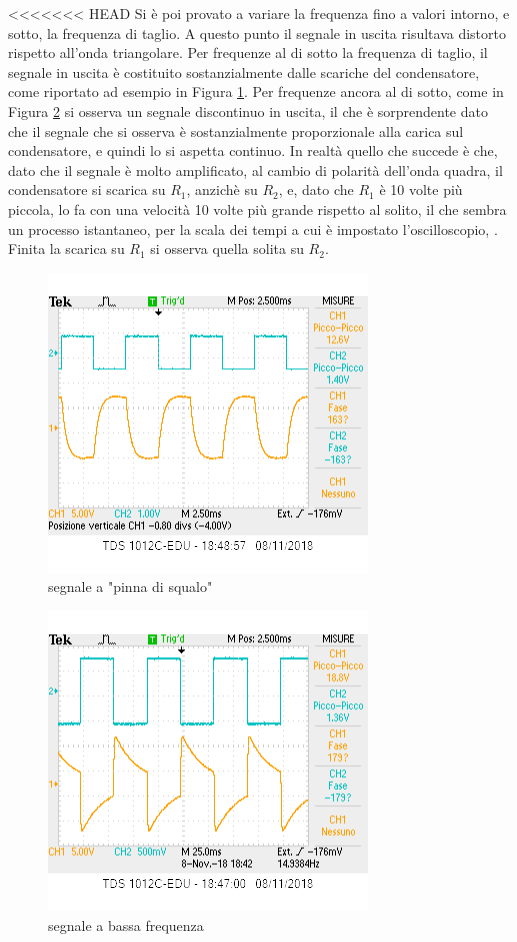 \documentclass[10pt,a4paper]{article}
\begin{document}
<<<<<<< HEAD
	Si è poi provato a variare la frequenza fino a valori intorno, e sotto, la frequenza di taglio. A questo punto il segnale in uscita risultava distorto rispetto all'onda triangolare. Per frequenze al di sotto la frequenza di taglio, il segnale in uscita è costituito sostanzialmente dalle scariche del condensatore, come riportato ad esempio in Figura \ref{fig:scariche}.
	Per frequenze ancora al di sotto, come in Figura \ref{fig:lowf} si osserva un segnale discontinuo in uscita, il che è sorprendente dato che il segnale che si osserva è sostanzialmente proporzionale alla carica sul condensatore, e quindi lo si aspetta continuo.  In realtà quello che succede è che, dato che il segnale è molto amplificato, al cambio di polarità dell'onda quadra, il condensatore si scarica su $R_1$, anzichè su $R_2$, e, dato che $R_1$ è 10 volte più piccola, lo fa con una velocità 10 volte più grande rispetto al solito, il che sembra un processo istantaneo, per la scala dei tempi a cui è impostato l'oscilloscopio, . Finita la scarica su $R_1$ si osserva quella solita su $R_2$. 
	\begin{figure}[h]

			\centering
			\includegraphics[scale=1]{scariche.png}

			\caption{segnale a "pinna di squalo"}
						\label{fig:scariche}

	\end{figure}
	\begin{figure}[h]
\centering
		\includegraphics[scale=1]{lowf.png}
					\caption{segnale a bassa frequenza}
		\label{fig:lowf}
		
	\end{figure}
	
\end{document}
